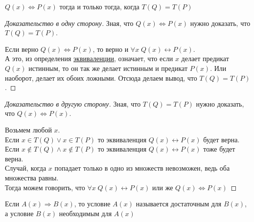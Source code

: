\begin{theorem}
    \hfill

    \begin{center}
        $Q(x) \Leftrightarrow P(x)$ тогда и только тогда, когда $T(Q) = T(P)$
    \end{center}
\end{theorem}

\begin{proof}[Доказательство в одну сторону]
    Зная, что $Q(x) \Leftrightarrow P(x)$ нужно доказать, что $T(Q) = T(P)$. 

    Если верно $Q(x) \Leftrightarrow P(x)$, то верно и $\forall x \; Q(x) \leftrightarrow P(x)$.\\
    А это, из определения \hyperref[def:Эквиваленция]{эквиваленции}, означает, что если $x$ делает предикат $Q(x)$ истинным, 
    то он так же делает истинным и предикат $P(x)$. Или наоборот, делает их обоих ложными. Отсюда делаем вывод,
    что $T(Q) = T(P)$.
\end{proof}

\begin{proof}[Доказательство в другую сторону]
    Зная, что $T(Q) = T(P)$ нужно доказать, что $Q(x) \Leftrightarrow P(x)$. 

    Возьмем любой $x$. \\
    Если $x \in T(Q) \lor x \in T(P)$ то эквиваленция $Q(x) \leftrightarrow P(x)$ будет верна. \\
    Если $x \notin T(Q) \land x \notin T(P)$ то эквиваленция $Q(x) \leftrightarrow P(x)$ тоже будет верна. \\
    Случай, когда $x$ попадает только в одно из множеств невозможен, ведь оба множества равны. \\
    Тогда можем говорить, что $\forall x \; Q(x) \leftrightarrow P(x)$ или же $Q(x) \Leftrightarrow P(x)$
\end{proof}

\begin{definition}
    Если $A(x) \Rightarrow B(x)$, то условие $A(x)$ называется достаточным для $B(x)$, а условие $B(x)$  необходимым для $A(x)$
\end{definition}

\newpage